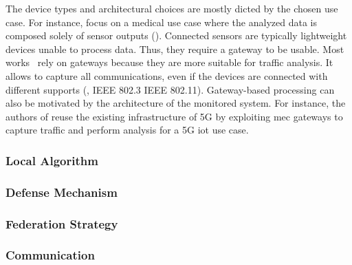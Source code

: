 The device types and architectural choices are mostly dicted by the chosen use case.
For instance, \textcite{zhang_BlockchainbasedFederatedLearning_2020} focus on a medical use case where the analyzed data is composed solely of sensor outputs ().
Connected sensors are typically lightweight devices unable to process data.
Thus, they require a gateway to be usable.
Most works~\cite{li_DeepFedFederatedDeep_2020,chen_Networkanomalydetection_2020,schneble_Attackdetectionusing_2019,zhao_MultiTaskNetworkAnomaly_2019,al-athbaal-marri_FederatedMimicLearning_2020,kim_CollaborativeAnomalyDetection_2020,chen_Networkanomalydetection_2020,popoola_FederatedDeepLearning_2021a} rely on gateways because they are more suitable for traffic analysis.
It allows to capture all communications, even if the devices are connected with different supports (\eg, IEEE 802.3 \vs IEEE 802.11).
Gateway-based processing can also be motivated by the architecture of the monitored system.
For instance, the authors of \cite{fan_IoTDefenderFederatedTransfer_2020} reuse the existing infrastructure of 5G by exploiting \gls{mec} gateways to capture traffic and perform analysis for a 5G \gls{iot} use case.



\subsubsection{Local Algorithm\label{sec:sota.quali.alg}}

\begin{table}[]
  \centering
  \caption{
    Comparative overview of selected works in the original study---algorithms and performance (2/2)%
    \label{tbl:selected.perf}%
  }%
  \resizebox{\textwidth}{!}{}
\end{table}

\subsubsection{Defense Mechanism\label{sec:sota.quali.defense}}

\subsubsection{Federation Strategy\label{sec:sota.quali.fed}}

\subsubsection{Communication\label{sec:sota.quali.comm}}

